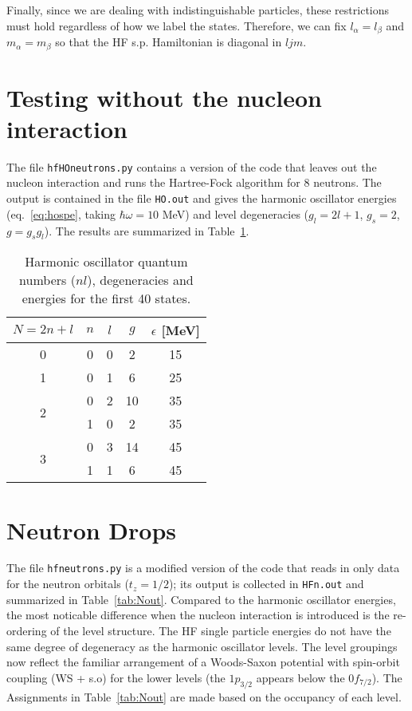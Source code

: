 \documentclass[]{scrartcl}
\begin{document}
Finally, since we are dealing with indistinguishable particles, these restrictions must hold regardless of how we label the states. Therefore, we can fix $l _{\alpha} = l _{\beta}$ and $m _{\alpha} = m _{\beta}$ so that the HF s.p. Hamiltonian is diagonal in $ljm$.

\section*{Testing without the nucleon interaction}

The file \texttt{hfHOneutrons.py} contains a version of the code that leaves out the nucleon interaction and runs the Hartree-Fock algorithm for 8 neutrons. The output is contained in the file \texttt{HO.out} and gives the harmonic oscillator energies (eq.~\ref{eq:hospe}, taking $\hbar \omega = 10$ MeV) and level degeneracies ($g_l=2l+1$, $g_s = 2$, $g=g_s g_l$). The results are summarized in Table~\ref{tab:HOout}.

\begin{table}[h]
\centering
	\begin{tabular}{ c | c c c | c }
	$N=2n + l$ & $n$ & $l$ & $g$ & $\epsilon$ [MeV]\\
\hline
	0 & 0 & 0 & 2 & 15 \\
\hline
	1 & 0 & 1 & 6 & 25\\
\hline
	\multirow{2}{*}{2} & 0 & 2 & 10 & 35 \\
	 & 1 & 0 & 2 & 35\\
\hline
	\multirow{2}{*}{3} & 0 & 3 & 14 & 45\\
	 & 1 & 1 & 6 & 45\\
\hline
	\end{tabular}
	\caption{Harmonic oscillator quantum numbers ($nl$), degeneracies and energies for the first 40 states.}
	\label{tab:HOout}
\end{table}

\section*{Neutron Drops}

The file \texttt{hfneutrons.py} is a modified version of the code that reads in only data for the neutron orbitals ($t_z = 1/2$); its output is collected in \texttt{HFn.out} and summarized in Table~\ref{tab:Nout}. Compared to the harmonic oscillator energies, the most noticable difference when the nucleon interaction is introduced is the re-ordering of the level structure. The HF single particle energies do not have the same degree of degeneracy as the harmonic oscillator levels. The level groupings now reflect the familiar arrangement of a Woods-Saxon potential with spin-orbit coupling (WS + s.o) for the lower levels (the $1 p _{3/2}$ appears below the $0 f _{7/2}$). The  Assignments in Table~\ref{tab:Nout} are made based on the occupancy of each level.
\end{document}
